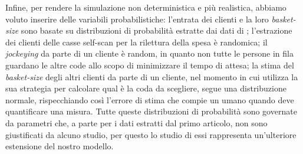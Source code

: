 Infine, per rendere la simulazione non deterministica e più realistica, abbiamo voluto inserire delle variabili probabilistiche: l'entrata dei clienti e la loro \textit{basket-size} sono basate su distribuzioni di probabilità estratte dai dati di \cite{article1}; l'estrazione dei clienti delle casse self-scan per la rilettura della spesa è randomica; il \textit{jockeying} da parte di un cliente è random, in quanto non tutte le persone in fila guardano le altre code allo scopo di minimizzare il tempo di attesa; la stima del \textit{basket-size} degli altri clienti da parte di un cliente, nel momento in cui utilizza la sua strategia per calcolare qual è la coda da scegliere, segue una distribuzione normale, rispecchiando così l'errore di stima che compie un umano quando deve quantificare una misura. Tutte queste distribuzioni di probabilità sono governate da parametri che, a parte per i dati estratti dal primo articolo, non sono giustificati da alcuno studio, per questo lo studio di essi rappresenta un'ulteriore estensione del nostro modello.